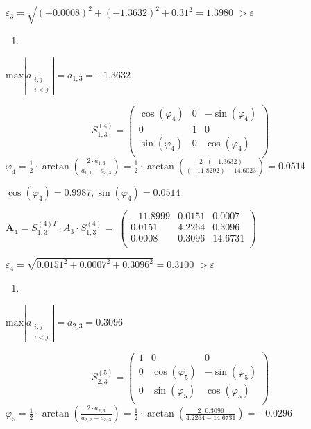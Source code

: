 \documentclass[10pt, a4paper]{scrartcl}
\begin{document}
\(\displaystyle \varepsilon_3 = \sqrt{(-0.0008)^2 + (-1.3632)^2 + 0.31^2 } = \mathbf{1.3980}\)
\(\displaystyle > \varepsilon\)

\begin{enumerate}
\def\labelenumi{\arabic{enumi})}
\setcounter{enumi}{3}
\item
\end{enumerate}

\(\displaystyle \text{max} |a_{\substack{i,j \\ i<j}}| = a_{1,3} = -1.3632\)

\[S_{1,3}^{(4)} = \begin{pmatrix} 
\cos(\varphi_{4}) & 0 & -\sin(\varphi_{4})\\
0 & 1 & 0\\
\sin(\varphi_{4}) & 0 & \cos(\varphi_{4})\\
\end{pmatrix}\]
\(\displaystyle \varphi_{4} = \frac{1}{2} \cdot \arctan\left(\frac{2 \cdot a_{1,3}}{a_{1,1} - a_{3,3}}\right) = \frac{1}{2} \cdot \arctan\left(\frac{2 \cdot (-1.3632)}{(-11.8292) - 14.6023}\right) = 0.0514\)

\(\displaystyle \cos(\varphi_4) = 0.9987, \sin(\varphi_4) = 0.0514\)

\(\displaystyle \mathbf{A_4} = S_{1,3}^{(4)T} \cdot A_3 \cdot S_{1,3}^{(4)} =\)
\(\displaystyle \begin{pmatrix} -11.8999 & 0.0151 & 0.0007\\ 0.0151 & 4.2264 & 0.3096\\ 0.0008 & 0.3096 & 14.6731\\ \end{pmatrix}\)

\(\displaystyle \varepsilon_4 = \sqrt{0.0151^2 + 0.0007^2 + 0.3096^2 } = \mathbf{0.3100}\)
\(\displaystyle > \varepsilon\)

\begin{enumerate}
\def\labelenumi{\arabic{enumi})}
\setcounter{enumi}{4}
\item
\end{enumerate}

\(\displaystyle \text{max} |a_{\substack{i,j \\ i<j}}| = a_{2,3} = 0.3096\)

\[S_{2,3}^{(5)} = \begin{pmatrix} 
1 & 0 & 0\\
0 & \cos(\varphi_{5}) & -\sin(\varphi_{5})\\
0 & \sin(\varphi_{5}) & \cos(\varphi_{5})\\
\end{pmatrix}\]
\(\displaystyle \varphi_{5} = \frac{1}{2} \cdot \arctan\left(\frac{2 \cdot a_{2,3}}{a_{2,2} - a_{3,3}}\right) = \frac{1}{2} \cdot \arctan\left(\frac{2 \cdot 0.3096}{4.2264 - 14.6731}\right) = -0.0296\)
\end{document}
